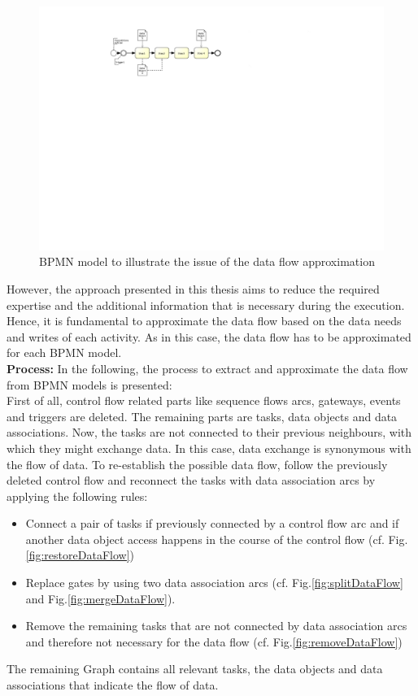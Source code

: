 \begin{figure}[h!]
	\centering
	\includegraphics[width=\textwidth, trim={3.5cm 15cm 12.5cm 2cm}]{img/ExtractDFDProblem.pdf}
	\caption{BPMN model to illustrate the issue of the data flow approximation}
	\label{fig:problemDataFlow}
\end{figure}

\noindent
However, the approach presented in this thesis aims to reduce the required expertise and the additional information that is necessary during the execution. 
Hence, it is fundamental to approximate the data flow based on the data needs and writes of each activity. As in this case, the data flow has to be approximated for each BPMN model. \\

\noindent
\textbf{Process:} In the following, the process to extract and approximate the data flow from BPMN models is presented: \\
First of all, control flow related parts like sequence flows arcs, gateways, events and triggers are deleted. The remaining parts are tasks, data objects and data associations. Now, the tasks are not connected to their previous neighbours, with which they might exchange data. In this case, data exchange is synonymous with the flow of data.
To re-establish the possible data flow, follow the previously deleted control flow and reconnect the tasks with data association arcs by applying the following rules:

\begin{itemize}
	\item Connect a pair of tasks if previously connected by a control flow arc and 
	if another data object access happens in the course of the control flow (cf. Fig.\ref{fig:restoreDataFlow})
	\item Replace gates by using two data association arcs (cf. Fig.\ref{fig:splitDataFlow} and Fig.\ref{fig:mergeDataFlow}). 
	\item Remove the remaining tasks that are not connected by data association arcs and therefore not necessary for the data flow (cf. Fig.\ref{fig:removeDataFlow})
	
\end{itemize}
The remaining Graph contains all relevant tasks, the data objects and data associations that indicate the flow of data.


